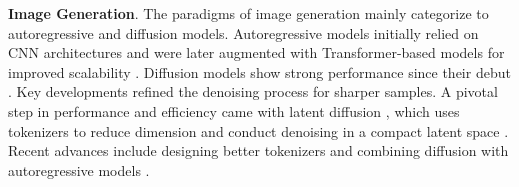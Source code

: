 \textbf{Image Generation}.  
The paradigms of image generation 
mainly categorize to autoregressive and diffusion models.
Autoregressive models initially relied on CNN architectures \cite{van2016conditional} and were later augmented with Transformer-based models \cite{vaswani2023attentionneed,yu2024randomized,lee2022autoregressive,liu2024customize,sun2024autoregressive} for improved scalability \cite{chang2022maskgitmaskedgenerativeimage,tian2024visualautoregressivemodelingscalable}. 
Diffusion models show strong performance since their debut \citet{sohldickstein2015deepunsupervisedlearningusing}. 
Key developments \cite{nichol2021improveddenoisingdiffusionprobabilistic,dhariwal2021diffusion,song2022denoisingdiffusionimplicitmodels} refined the denoising process for sharper samples. 
A pivotal step in performance and efficiency came with latent diffusion \cite{vahdat2021scorebasedgenerativemodelinglatent,rombach2022highresolutionimagesynthesislatent}, which uses tokenizers to reduce dimension and conduct denoising in a compact latent space \cite{van2017neural,esser2021taming, peebles2023scalablediffusionmodelstransformers}. 
Recent advances include designing better tokenizers \cite{chen2024softvq,zha2024language,yao2025reconstruction}
and combining diffusion with autoregressive models \cite{li2024autoregressiveimagegenerationvector}. 

